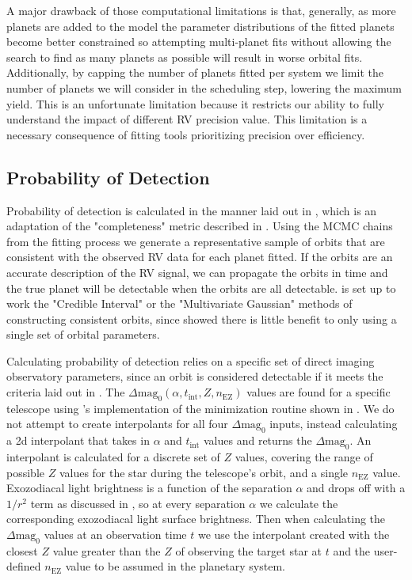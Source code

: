 A major drawback of those computational limitations is that, generally, as more
planets are added to the model the parameter distributions of the fitted
planets become better constrained so attempting multi-planet fits without
allowing the search to find as many planets as possible will result in worse
orbital fits. Additionally, by capping the number of planets fitted per system
we limit the number of planets we will consider in the scheduling step,
lowering the maximum yield. This is an unfortunate limitation because it
restricts our ability to fully understand the impact of different RV precision
value. This limitation is a necessary consequence of fitting tools prioritizing
precision over efficiency.

\subsection{Probability of Detection}

Probability of detection is calculated in the manner laid out in
, which is an adaptation of the "completeness" metric
described in \citet{brownSingleVisitPhotometric2005}. Using the MCMC chains
from the fitting process we generate a representative sample of orbits that are
consistent with the observed RV data for each planet fitted. If the orbits are
an accurate description of the RV signal, we can propagate the orbits in time
and the true planet will be detectable when the orbits are all detectable.
 is set up to work the "Credible Interval" or the
"Multivariate Gaussian" methods of constructing consistent orbits, since
 showed there is little benefit to only using a single
set of orbital parameters.

Calculating probability of detection relies on a specific set of direct imaging
observatory parameters, since an orbit is considered detectable if it meets the
criteria laid out in . The
$\Delta\textrm{mag}_0(\alpha, t_{\textrm{int}}, Z, n_\textrm{EZ})$ values are
found for a specific telescope using 's
implementation of the minimization routine shown in 
. We do not attempt to create
interpolants for all four $\Delta\textrm{mag}_0$ inputs, instead calculating a
2d interpolant that takes in $\alpha$ and $t_\textrm{int}$ values and returns
the $\Delta\textrm{mag}_0$. An interpolant is calculated for a discrete set of
$Z$ values, covering the range of possible $Z$ values for the star during the
telescope's orbit, and a single $n_\textrm{EZ}$ value. Exozodiacal light
brightness is a function of the separation $\alpha$ and drops off with a
$1/r^2$ term as discussed in \citet{starkMaximizingExoEarthCandidate2014}, so
at every separation $\alpha$ we calculate the corresponding exozodiacal light
surface brightness. Then when calculating the $\Delta\textrm{mag}_0$ values at
an observation time $t$ we use the interpolant created with the closest $Z$
value greater than the $Z$ of observing the target star at $t$ and the
user-defined $n_\textrm{EZ}$ value to be assumed in the planetary system. 

